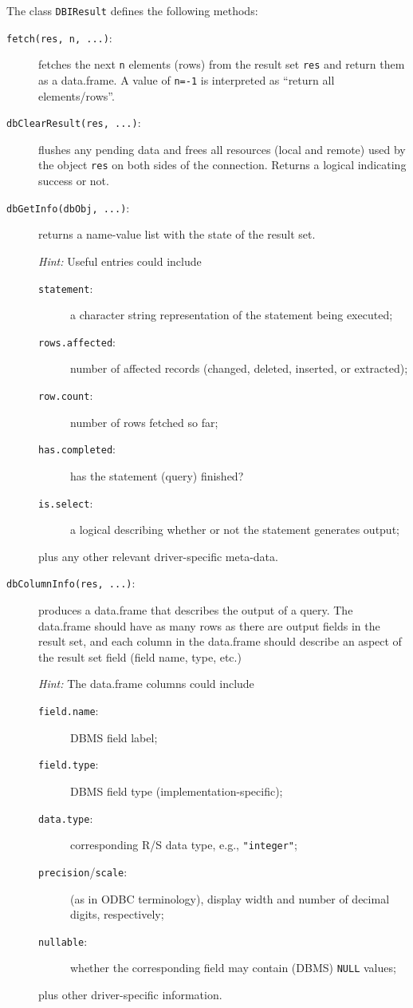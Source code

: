\documentclass{article}
\newcommand{\sobj}[1]{\mbox{\tt #1}}    %
\newcommand{\sexp}[1]{\mbox{\tt #1}}    %
\newcommand{\sclass}[1]{\mbox{\tt #1}}  %
\newcommand{\smethod}[1]{\mbox{\tt #1}} %
\begin{document}
The class \sclass{DBIResult} defines the following methods:
\begin{description}
\item[\smethod{fetch(res, n, ...)}:]\label{meth:fetch}
  fetches the next \sobj{n} elements (rows) from the result set
  \sobj{res} and return them as a data.frame.  A value of \sexp{n=-1}
  is interpreted as ``return all elements/rows''.

\item[\smethod{dbClearResult(res, ...)}:]
  flushes any pending data and frees all resources (local and
  remote) used by the object \sobj{res} on both sides of the
  connection. Returns a logical indicating success or not.

\item[\smethod{dbGetInfo(dbObj, ...)}:]
   returns a name-value list with the state of the result set.

   \emph{Hint:} Useful entries could include
   \begin{description}
   \item[\sobj{statement}:] a character string representation of the
   statement being executed;
   \item[\sobj{rows.affected}:] number of affected records (changed, 
   deleted, inserted, or extracted);
   \item[\sobj{row.count}:] number of rows fetched so far;
   \item[\sobj{has.completed}:] has the statement (query) finished?
   \item[\sobj{is.select}:] a logical describing whether or not the
   statement generates output;
   \end{description}
   plus any other relevant driver-specific meta-data.

\item[\smethod{dbColumnInfo(res, ...)}:]
   produces a data.frame that describes the output of a query. 
   The data.frame should have as many rows as there are output
   fields in the result set, and each column in the data.frame
   should describe an aspect of the result set field (field name,
   type, etc.)
 
   \emph{Hint:} The data.frame columns could include 
   \begin{description}
   \item[\sobj{field.name}:] DBMS field label;
   \item[\sobj{field.type}:] DBMS field type (implementation-specific);
   \item[\sobj{data.type}:] corresponding R/S data type, e.g., 
   \sexp{"integer"};
   \item[\sobj{precision}/\sobj{scale}:] (as in ODBC terminology),  
   display width and number of decimal digits, respectively;
   \item[\sobj{nullable}:] whether the corresponding field may contain
   (DBMS) \texttt{NULL} values;
   \end{description}
   plus other driver-specific information.


\end{description}
\end{document}

